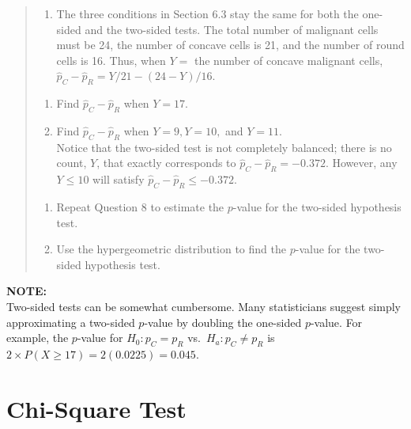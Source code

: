 \documentclass[
]{report}
\providecommand{\tightlist}{%
  \setlength{\itemsep}{0pt}\setlength{\parskip}{0pt}}
\begin{document}
\begin{quote}
\begin{enumerate}
\def\labelenumi{\arabic{enumi}.}
\setcounter{enumi}{13}
\tightlist
\item
  The three conditions in Section 6.3 stay the same for both the one-sided and the two-sided tests. The total number of malignant cells must be 24, the number of concave cells is 21, and the number of round cells is 16. Thus, when \(Y =\) the number of concave malignant cells, \(\hat p_C - \hat p_R = Y/21 - (24 - Y)/16\).\\
\end{enumerate}

\begin{enumerate}
\def\labelenumi{\alph{enumi}.}
\tightlist
\item
  Find \(\hat p_C - \hat p_R\) when \(Y = 17\).\\
\item
  Find \(\hat p_C - \hat p_R\) when \(Y = 9, Y = 10,\) and \(Y = 11\).\\
  Notice that the two-sided test is not completely balanced; there is no count, \(Y\), that exactly corresponds to \(\hat p_C - \hat p_R = -0.372\). However, any \(Y \le 10\) will satisfy \(\hat p_C - \hat p_R \le -0.372\).\\
\end{enumerate}

\begin{enumerate}
\def\labelenumi{\arabic{enumi}.}
\setcounter{enumi}{14}
\tightlist
\item
  Repeat Question 8 to estimate the \(p\)-value for the two-sided hypothesis test.\\
\item
  Use the hypergeometric distribution to find the \(p\)-value for the two-sided hypothesis test.
\end{enumerate}
\end{quote}

\large

\textbf{NOTE:}\\
Two-sided tests can be somewhat cumbersome. Many statisticians suggest simply approximating a two-sided \(p\)-value by doubling the one-sided \(p\)-value. For example, the \(p\)-value for \(H_0: p_C = p_R\) vs.~\(H_a: p_C \neq p_R\) is \(2 \times P(X \ge 17) = 2(0.0225) = 0.045\).\\
\normalsize

\section{\texorpdfstring{\textbf{Chi-Square Test}}{Chi-Square Test}}\label{chi-square-test}
\end{document}
